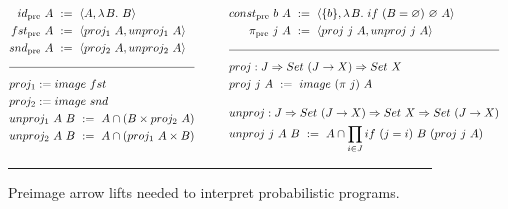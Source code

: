 \documentclass{llncs}
\newcommand{\smallmathfont}{\fontsize{7.5}{9}\selectfont}
\newcommand{\pre}{_\mathrm{pre}}
\begin{document}
\begin{figure*}[t]\centering
\smallmathfont
\begin{align*}
\begin{aligned}[t]
	&\begin{aligned}[t]
		id\pre~A &\ := \ \pair{A,\fun{B}{B}} \\
		fst\pre~A &\ := \ \pair{proj_1~A,unproj_1~A} \\
		snd\pre~A &\ := \ \pair{proj_2~A,unproj_2~A} \\
	\end{aligned} \\
\\[-6pt]
\hline
\\[-6pt]
	&\begin{aligned}[t]
		&proj_1 := image~fst \\
		&proj_2 := image~snd \\
		&unproj_1~A~B \ := \ A \i (B \times proj_2~A) \\
		&unproj_2~A~B \ := \ A \i (proj_1~A \times B)
	\end{aligned}
\end{aligned}
&\tab\tab\tab
\begin{aligned}[t]
	&\begin{aligned}[t]
		const\pre~b~A &\ := \ \pair{\set{b},\fun{B}{if~(B = \emptyset)~\emptyset~A}} \\
		\pi\pre~j~A &\ := \ \pair{proj~j~A, unproj~j~A}
	\end{aligned} \\
\\[-6pt]
\hline
\\[-6pt]
	&\begin{aligned}[t]
		&proj : J \tto Set~(J \to X) \tto Set~X \\
		&proj~j~A \ := \ image~(\pi~j)~A
	\end{aligned} \\
\\[-6pt]
	&\begin{aligned}[t]
		&unproj : J \tto Set~(J \to X) \tto Set~X \tto Set~(J \to X) \\
		&unproj~j~A~B \ := \ A \i \prod_{i \in J} if~(j = i)~B~(proj~j~A)
	\end{aligned}
\end{aligned}
\end{align*}
\vspace{-0.5\baselineskip}
\hrule
\caption[ ]{Preimage arrow lifts needed to interpret probabilistic programs.}
\label{fig:extra-preimage-arrow-defs}
\end{figure*}
\end{document}
